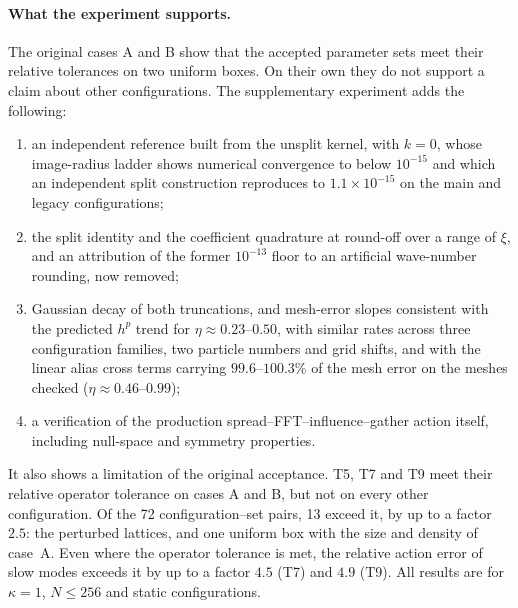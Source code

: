 \paragraph{What the experiment supports.}
The original cases A and B show that the accepted parameter sets meet their relative tolerances on two uniform boxes.
On their own they do not support a claim about other configurations. The supplementary experiment adds the following:
\begin{enumerate}
\item an independent reference built from the unsplit kernel, with $k=0$, whose image-radius ladder shows numerical
  convergence to below $10^{-15}$ and which an independent split construction reproduces to $1.1\times10^{-15}$ on the main and legacy
  configurations;
\item the split identity and the coefficient quadrature at round-off over a range of $\xi$, and an attribution of the
  former $10^{-13}$ floor to an artificial wave-number rounding, now removed;
\item Gaussian decay of both truncations, and mesh-error slopes consistent with the predicted $h^p$ trend for
  $\eta\approx0.23$--$0.50$, with similar rates across three configuration families, two particle
  numbers and grid shifts, and with the linear alias cross terms carrying $99.6$--$100.3\%$ of the mesh error on the
  meshes checked ($\eta\approx0.46$--$0.99$);
\item a verification of the production spread--FFT--influence--gather action itself, including null-space and symmetry
  properties.
\end{enumerate}
It also shows a limitation of the original acceptance. T5, T7 and T9 meet their relative operator tolerance on
cases A and B, but not on every other configuration. Of the 72 configuration--set pairs, 13 exceed it, by up to a
factor $2.5$: the perturbed lattices, and one uniform box with the size and density of case~A. Even where the operator tolerance
is met, the relative action error of slow modes exceeds it by up to a factor $4.5$ (T7) and $4.9$ (T9). All results are for $\kappa=1$,
$N\le256$ and static configurations.

